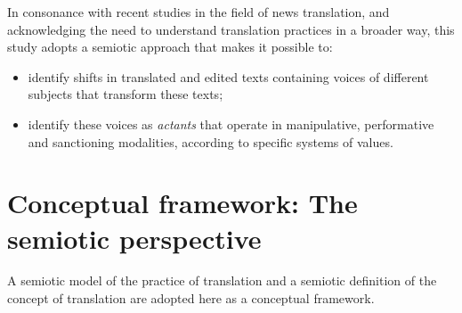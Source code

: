 \documentclass[output=paper]{LSP/langsci}
\begin{document}
In consonance with recent studies in the field of news translation, and acknowledging the need to understand translation practices in a broader way, this study adopts a semiotic approach that makes it possible to:

\begin{itemize}
 \item identify shifts in translated and edited texts containing voices of different subjects that transform these texts;
 \item identify these voices as \textit{actants} that operate in manipulative, performative and sanctioning modalities, according to specific systems of values.
\end{itemize}


\section{Conceptual framework: The semiotic perspective}

A semiotic model of the practice of translation and a semiotic definition of the concept of translation are adopted here as a conceptual framework.
\end{document}
